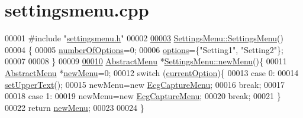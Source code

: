 \hypertarget{settingsmenu_8cpp_source}{}\section{settingsmenu.\+cpp}
\label{settingsmenu_8cpp_source}

\begin{DoxyCode}
00001 \textcolor{preprocessor}{#include "\hyperlink{settingsmenu_8h}{settingsmenu.h}"}
00002 
\hypertarget{settingsmenu_8cpp_source.tex_l00003}{}\hyperlink{classSettingsMenu_a951edfbd3cf728a1e91887fe08df8d7e}{00003} \hyperlink{classSettingsMenu_a951edfbd3cf728a1e91887fe08df8d7e}{SettingsMenu::SettingsMenu}()
00004 \{
00005         \hyperlink{classAbstractMenu_a6caff7f6281c6c2912e5f808c2906123}{numberOfOptions}=0;
00006         \hyperlink{classAbstractMenu_a990dc4299fbe86152487fd35d46a403b}{options}=\{\textcolor{stringliteral}{"Setting1"}, \textcolor{stringliteral}{"Setting2"}\};
00007 
00008 \}
00009 
\hypertarget{settingsmenu_8cpp_source.tex_l00010}{}\hyperlink{classSettingsMenu_abc441c12e8044c13f1a99791e2ee30d1}{00010} \hyperlink{classAbstractMenu}{AbstractMenu} *\hyperlink{classSettingsMenu_abc441c12e8044c13f1a99791e2ee30d1}{SettingsMenu::newMenu}()\{
00011     \hyperlink{classAbstractMenu}{AbstractMenu} *\hyperlink{classSettingsMenu_abc441c12e8044c13f1a99791e2ee30d1}{newMenu}=0;
00012     \textcolor{keywordflow}{switch} (\hyperlink{classAbstractMenu_a589fea1bf68c33e0eff64c8b609cb980}{currentOption})\{
00013     \textcolor{keywordflow}{case} 0:
00014         \hyperlink{classAbstractMenu_a4163c42d2127430e184612cb95211cda}{setUpperText}();
00015         newMenu=\textcolor{keyword}{new} \hyperlink{classEcgCaptureMenu_ac430bc0a2eb1879fe77cd0133d4dd704}{EcgCaptureMenu};
00016         \textcolor{keywordflow}{break};
00017 
00018     \textcolor{keywordflow}{case} 1:
00019         newMenu=\textcolor{keyword}{new} \hyperlink{classEcgCaptureMenu_ac430bc0a2eb1879fe77cd0133d4dd704}{EcgCaptureMenu};
00020         \textcolor{keywordflow}{break};
00021     \}
00022     \textcolor{keywordflow}{return} \hyperlink{classSettingsMenu_abc441c12e8044c13f1a99791e2ee30d1}{newMenu};
00023 
00024 \}
\end{DoxyCode}
